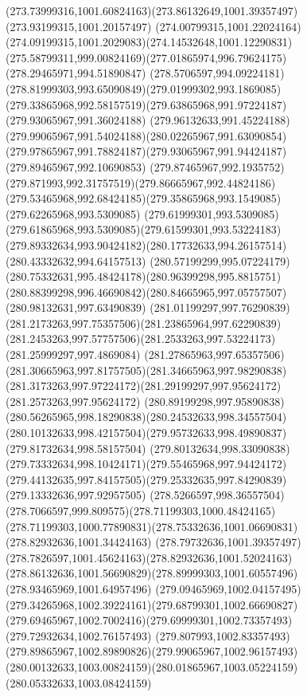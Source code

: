 {{		\curveto(273.73999316,1001.60824163)(273.86132649,1001.39357497)(273.93199315,1001.20157497)
		\curveto(274.00799315,1001.22024164)(274.09199315,1001.2029083)(274.14532648,1001.12290831)
		\curveto(275.58799311,999.00824169)(277.01865974,996.79624175)(278.29465971,994.51890847)
		\curveto(278.5706597,994.09224181)(278.81999303,993.65090849)(279.01999302,993.1869085)
		\curveto(279.33865968,992.58157519)(279.63865968,991.97224187)(279.93065967,991.36024188)
		\curveto(279.96132633,991.45224188)(279.99065967,991.54024188)(280.02265967,991.63090854)
		\curveto(279.97865967,991.78824187)(279.93065967,991.94424187)(279.89465967,992.10690853)
		\curveto(279.87465967,992.1935752)(279.871993,992.31757519)(279.86665967,992.44824186)
		\curveto(279.53465968,992.68424185)(279.35865968,993.1549085)(279.62265968,993.5309085)
		\curveto(279.61999301,993.5309085)(279.61865968,993.5309085)(279.61599301,993.53224183)
		\curveto(279.89332634,993.90424182)(280.17732633,994.26157514)(280.43332632,994.64157513)
		\curveto(280.57199299,995.07224179)(280.75332631,995.48424178)(280.96399298,995.8815751)
		\curveto(280.88399298,996.46690842)(280.84665965,997.05757507)(280.98132631,997.63490839)
		\curveto(281.01199297,997.76290839)(281.2173263,997.75357506)(281.23865964,997.62290839)
		\curveto(281.2453263,997.57757506)(281.2533263,997.53224173)(281.25999297,997.4869084)
		\curveto(281.27865963,997.65357506)(281.30665963,997.81757505)(281.34665963,997.98290838)
		\curveto(281.3173263,997.97224172)(281.29199297,997.95624172)(281.2573263,997.95624172)
		\curveto(280.89199298,997.95890838)(280.56265965,998.18290838)(280.24532633,998.34557504)
		\curveto(280.10132633,998.42157504)(279.95732633,998.49890837)(279.81732634,998.58157504)
		\curveto(279.80132634,998.33090838)(279.73332634,998.10424171)(279.55465968,997.94424172)
		\curveto(279.44132635,997.84157505)(279.25332635,997.84290839)(279.13332636,997.92957505)
		\curveto(278.5266597,998.36557504)(278.7066597,999.809575)(278.71199303,1000.48424165)
		\curveto(278.71199303,1000.77890831)(278.75332636,1001.06690831)(278.82932636,1001.34424163)
		\curveto(278.79732636,1001.39357497)(278.7826597,1001.45624163)(278.82932636,1001.52024163)
		\curveto(278.86132636,1001.56690829)(278.89999303,1001.60557496)(278.93465969,1001.64957496)
		\curveto(279.09465969,1002.04157495)(279.34265968,1002.39224161)(279.68799301,1002.66690827)
		\curveto(279.69465967,1002.7002416)(279.69999301,1002.73357493)(279.72932634,1002.76157493)
		\curveto(279.807993,1002.83357493)(279.89865967,1002.89890826)(279.99065967,1002.96157493)
		\curveto(280.00132633,1003.00824159)(280.01865967,1003.05224159)(280.05332633,1003.08424159)
}}
